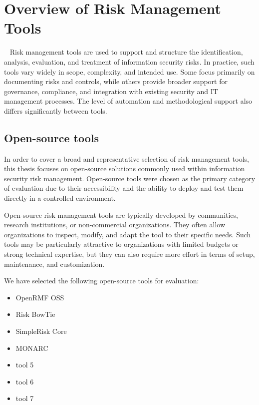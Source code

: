 \section{Overview of Risk Management Tools}
~\label{chap:tool-overview}
Risk management tools are used to support and structure the identification, analysis, evaluation, and treatment of information security risks. In practice, such tools vary widely in scope, complexity, and intended use. Some focus primarily on documenting risks and controls, while others provide broader support for governance, compliance, and integration with existing security and IT management processes. The level of automation and methodological support also differs significantly between tools.

\subsection{Open-source tools}

In order to cover a broad and representative selection of risk management tools, this
thesis focuses on open-source solutions commonly used within information security risk
management. Open-source tools were chosen as the primary category of evaluation due to
their accessibility and the ability to deploy and test them directly in a controlled
environment.

Open-source risk management tools are typically developed by communities, research
institutions, or non-commercial organizations. They often allow organizations to inspect,
modify, and adapt the tool to their specific needs. Such tools may be particularly
attractive to organizations with limited budgets or strong technical expertise, but they
can also require more effort in terms of setup, maintenance, and customization.

We have selected the following open-source tools for evaluation:

\begin{itemize}
    \item OpenRMF OSS
    \item Risk BowTie
    \item SimpleRisk Core
    \item MONARC
    \item tool 5
    \item tool 6
    \item tool 7
\end{itemize}